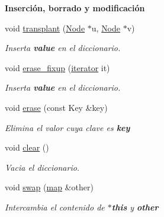 \begin{Indent}{\bf \-Inserción, borrado y modificación}
\begin{DoxyCompactItemize}
void \hyperlink{classaed2_1_1map_a98b9f200c64ce02dfb67902ee00e375a_a98b9f200c64ce02dfb67902ee00e375a}{transplant} (\hyperlink{structaed2_1_1map_1_1Node}{\-Node} $\ast$u, \hyperlink{structaed2_1_1map_1_1Node}{\-Node} $\ast$v)
\begin{DoxyCompactList}\small\item\em \-Inserta {\bfseries value} en el diccionario. \end{DoxyCompactList}\item 
void \hyperlink{classaed2_1_1map_a7870c8f26e82b00d0aeb2e9f331dfec6_a7870c8f26e82b00d0aeb2e9f331dfec6}{erase\-\_\-fixup} (\hyperlink{classaed2_1_1map_1_1iterator}{iterator} it)
\begin{DoxyCompactList}\small\item\em \-Inserta {\bfseries value} en el diccionario. \end{DoxyCompactList}\item 
void \hyperlink{classaed2_1_1map_a2ffadb42cd5f0bc7b3752ff159b75334_a2ffadb42cd5f0bc7b3752ff159b75334}{erase} (const \-Key \&key)
\begin{DoxyCompactList}\small\item\em \-Elimina el valor cuya clave es {\bfseries key} \end{DoxyCompactList}\item 
void \hyperlink{classaed2_1_1map_a2bfa5165825979bf2431db55bc6bc9ca_a2bfa5165825979bf2431db55bc6bc9ca}{clear} ()
\begin{DoxyCompactList}\small\item\em \-Vacia el diccionario. \end{DoxyCompactList}\item 
void \hyperlink{classaed2_1_1map_a43ddb71cc91e5c6021a7a1f243d6cc4a_a43ddb71cc91e5c6021a7a1f243d6cc4a}{swap} (\hyperlink{classaed2_1_1map}{map} \&other)
\begin{DoxyCompactList}\small\item\em \-Intercambia el contenido de {\bfseries $\ast$this} y {\bfseries other} \end{DoxyCompactList}\end{DoxyCompactItemize}
\end{Indent}
